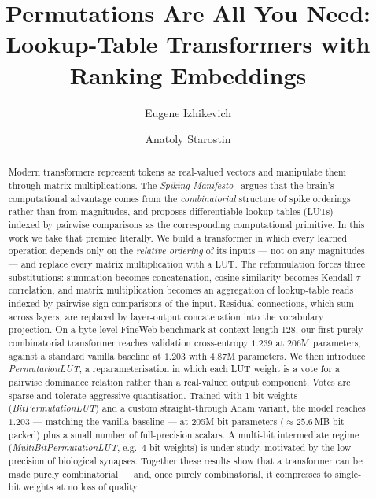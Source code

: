 \documentclass[11pt]{article}
\begin{document}
\title{\Large\textbf{Permutations Are All You Need:\\Lookup-Table Transformers with Ranking Embeddings}}

\author{Eugene Izhikevich \and Anatoly Starostin}
\date{}

\maketitle

\begin{abstract}
Modern transformers represent tokens as real-valued vectors and manipulate them through matrix multiplications.
The \emph{Spiking Manifesto}~\cite{ref:manifesto} argues that the brain's computational advantage comes from the \emph{combinatorial} structure of spike orderings rather than from magnitudes, and proposes differentiable lookup tables (LUTs) indexed by pairwise comparisons as the corresponding computational primitive.
In this work we take that premise literally.
We build a transformer in which every learned operation depends only on the \emph{relative ordering} of its inputs --- not on any magnitudes --- and replace every matrix multiplication with a LUT.
The reformulation forces three substitutions: summation becomes concatenation, cosine similarity becomes Kendall-$\tau$ correlation, and matrix multiplication becomes an aggregation of lookup-table reads indexed by pairwise sign comparisons of the input.
Residual connections, which sum across layers, are replaced by layer-output concatenation into the vocabulary projection.
On a byte-level FineWeb benchmark at context length 128, our first purely combinatorial transformer reaches validation cross-entropy $1.239$ at 206M parameters, against a standard vanilla baseline at $1.203$ with 4.87M parameters.
We then introduce \emph{PermutationLUT}, a reparameterisation in which each LUT weight is a vote for a pairwise dominance relation rather than a real-valued output component.
Votes are sparse and tolerate aggressive quantisation.
Trained with 1-bit weights (\emph{BitPermutationLUT}) and a custom straight-through Adam variant, the model reaches $1.203$ --- matching the vanilla baseline --- at 205M bit-parameters ($\approx 25.6$\,MB bit-packed) plus a small number of full-precision scalars.
A multi-bit intermediate regime (\emph{MultiBitPermutationLUT}, e.g.\ 4-bit weights) is under study, motivated by the low precision of biological synapses.
Together these results show that a transformer can be made purely combinatorial --- and, once purely combinatorial, it compresses to single-bit weights at no loss of quality.
\end{abstract}
\end{document}
